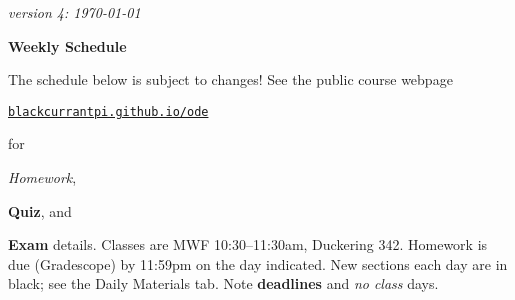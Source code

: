 \documentclass[12pt]{article}
\newcommand{\vacinline}[1]{{\color{OliveGreen} \textsl{#1}}}
\newcommand{\due}[1]{\strut {\color{BrickRed} \textsl{#1}}}
\newcommand{\ee}[1]{\strut {\color{Blue} \textbf{#1}}}
\newcommand{\dlinline}[1]{{\color{Purple} \textbf{#1}}}
\begin{document}
\hfill \small \emph{version 4: \today} \normalsize

\bigskip\bigskip
\centerline{\Large \textbf{Weekly Schedule}}

\bigskip
The schedule below is subject to changes!  See the public course webpage

\medskip

\centerline{\href{https://blackcurrantpi.github.io/ode}{\texttt{blackcurrantpi.github.io/ode}}}

\noindent for \due{Homework}, \ee{Quiz}, and \ee{Exam} details.  Classes are MWF 10:30--11:30am, Duckering 342.  Homework is due (Gradescope) by 11:59pm on the day indicated.  New sections each day are in black; see the Daily Materials tab.  Note \dlinline{deadlines} and \vacinline{no class} days.

\bigskip
\end{document}
